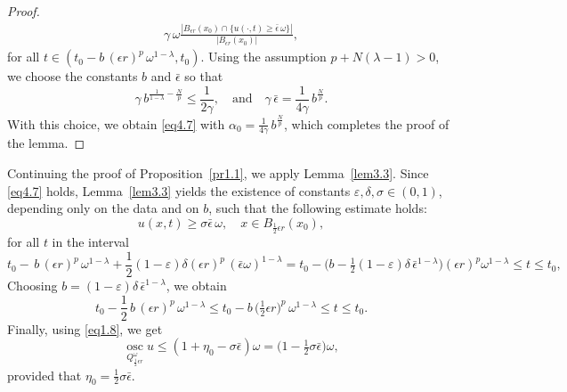 \documentclass[a4paper,11pt,fullpage]{article}
\DeclareMathOperator*{\osc}{osc}
\numberwithin{equation}{section}
\begin{document}
\begin{proof}
\begin{align}
\gamma\,\omega\frac{|B_{\epsilon r}(x_0)\cap\{u(\cdot, t)\geqslant \bar{\epsilon}\,\omega\}|}{|B_{\epsilon r}(x_0)|},
\end{align}
for all $t\in (t_0-b\,(\epsilon r)^{p}\,\omega^{1-\lambda}, t_0)$.
Using the assumption $p+N(\lambda-1)>0$, we choose the constants $b$ and
$\bar{\epsilon}$ so that
\begin{equation*}
\gamma \,b^{\frac{1}{1-\lambda}-\frac{N}{p}}\leqslant \frac{1}{2\gamma},\quad \text{and}\quad \gamma\,\bar{\epsilon}=\frac{1}{4\gamma}\,b^{\frac{N}{p}}.
\end{equation*}
With this choice, we obtain \eqref{eq4.7} with $\alpha_0=\frac{1}{4\gamma}\,b^{\frac{N}{p}}$, which completes the proof of the lemma.
\end{proof}

Continuing the proof of Proposition~\ref{pr1.1}, we apply Lemma~\ref{lem3.3}. Since \eqref{eq4.7} holds, Lemma~\ref{lem3.3} yields the existence of constants $\varepsilon, \delta, \sigma\in(0,1)$, depending only on the data and on $b$, such that the following estimate holds:
$$u(x, t)\geqslant \sigma\bar{\epsilon}\,\omega,\quad x\in B_{\frac{1}{2} \epsilon r}(x_0),$$
for all $t$ in the interval
\begin{equation*}
t_0-\,b\,(\epsilon r)^{p}\,\omega^{1-\lambda}+\frac{1}{2}(1-\varepsilon)\delta(\epsilon r)^{p}\,(\bar{\epsilon}\omega)^{1-\lambda} = t_0-\big(b-\tfrac{1}{2}(1-\varepsilon)\delta\,\bar{\epsilon}^{1-\lambda}\big)(\epsilon r)^{p}\omega^{1-\lambda}\leqslant  t\leqslant t_0,
\end{equation*}
Choosing $b=(1-\varepsilon)\delta\,\bar{\epsilon}^{1-\lambda}$, we obtain
\begin{equation*}
t_0-\frac{1}{2}\,b\,(\epsilon r)^{p}\,\omega^{1-\lambda}\leqslant t_0-b\,\big(\tfrac{1}{2}\epsilon r\big)^{p}\,\omega^{1-\lambda}\leqslant t\leqslant t_0.
\end{equation*}
Finally, using \eqref{eq1.8}, we get
\begin{equation}\label{eq4.9}
\osc\limits_{Q^{\omega}_{\frac{1}{2}\epsilon r}} u\leqslant (1+\eta_0-\sigma\bar{\epsilon})\omega=\big(1-\tfrac{1}{2}\sigma\bar{\epsilon}\big)\omega,
\end{equation}
provided that $\eta_0= \frac{1}{2}\sigma\bar{\epsilon}$. 
\end{document}
